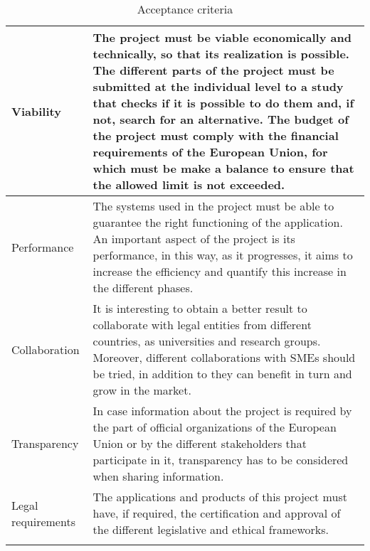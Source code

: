 \begin{longtable}[H]{ p{4cm} p{10cm} }
	\hline
	
	Viability & The project must be viable economically and technically, so that its realization is possible. \newline
	The different parts of the project must be submitted at the individual level to a study that checks if it is possible to do them and, if not, search for an alternative. \newline
	The budget of the project must comply with the financial requirements of the European Union, for which must be make a balance to ensure that the allowed limit is not exceeded. \\
	
	\hline
	
	Performance & The systems used in the project must be able to guarantee the right functioning of the application. An important aspect of the project is its performance, in this way, as it progresses, it aims to increase the efficiency and quantify this increase in the different phases. \\
	
	\hline
	
	Collaboration & It is interesting to obtain a better result to collaborate with legal entities from different countries, as universities and research groups. Moreover, different collaborations with SMEs should be tried, in addition to they can benefit in turn and grow in the market.	\\
	
	\hline
	
	Transparency & In case information about the project is required by the part of official organizations of the European Union or by the different stakeholders that participate in it, transparency has to be considered when sharing information. \\
	
	\hline
	
	Legal requirements & The applications and products of this project must have, if required, the certification and approval of the different legislative and ethical frameworks. \\
	
	\bottomrule[2pt]
	
	\caption{Acceptance criteria}
\end{longtable}